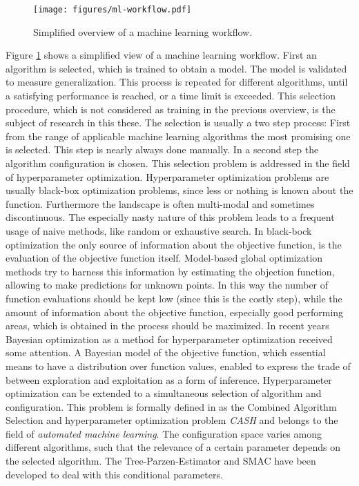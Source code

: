 \documentclass[english]{article}
\begin{document}
\begin{figure}[h]
  \centering
  \texttt{[image: figures/ml-workflow.pdf]}
  \caption{Simplified overview of a machine learning workflow.}
  \label{ml-workflow}
\end{figure}

Figure \ref{ml-workflow} shows a simplified view of a machine learning workflow. First an algorithm is selected, which is trained to obtain a model. The model is validated to measure generalization. This process is repeated for different algorithms, until a satisfying performance is reached, or a time limit is exceeded. This selection procedure, which is not considered as training in the previous overview, is the subject of research in this these.
The selection is usually a two step process: First from the range of applicable machine learning algorithms the most promising one is selected. This step is nearly always done manually. In a second step the algorithm configuration is chosen. This selection problem is addressed in the field of hyperparameter optimization.
Hyperparameter optimization problems are usually black-box optimization problems, since less or nothing is known about the function. Furthermore the  landscape is often multi-modal and sometimes discontinuous. The especially nasty nature of this problem leads to a frequent usage of naive methods, like random or exhaustive search.
In black-bock optimization the only source of information about the objective function, is the evaluation of the objective function itself. Model-based global optimization methods try to harness this information by estimating the objection function, allowing to make predictions for unknown points. In this way the number of function evaluations should be kept low (since this is the costly step), while the amount of information about the objective function, especially good performing areas, which is obtained in the process should be maximized.
In recent years Bayesian optimization as a method for hyperparameter optimization received some attention. A Bayesian model of the objective function, which essential means to have a distribution over function values, enabled to express the trade of between exploration and exploitation as a form of inference.
Hyperparameter optimization can be extended to a simultaneous selection of algorithm and configuration. This problem is formally defined in \cite{feurer_efficient_2015} as the Combined Algorithm Selection and hyperparameter optimization problem \textit{CASH} and belongs to the field of \textit{automated machine learning}. The configuration space varies among different algorithms, such that the relevance of a certain parameter depends on the selected algorithm. The Tree-Parzen-Estimator and SMAC have been developed to deal with this conditional parameters.
\end{document}
